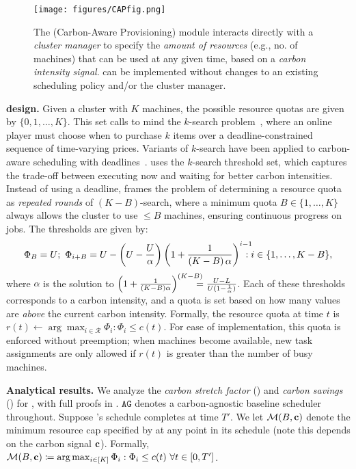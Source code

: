\begin{figure}[t]
    \centering 
    \texttt{[image: figures/CAPfig.png]}\vspace{-1em}
    \caption{The \CAP (Carbon-Aware Provisioning) module interacts directly with a \textit{cluster manager} %
    to specify the \textit{amount of resources} (e.g., no. of machines) that can be used at any given time, based on a \textit{carbon intensity signal}.  \CAP can be implemented without changes to an existing scheduling policy and/or the cluster manager.}
    \label{fig:cap-diagram}\vspace{-0.5cm}
\end{figure}


\noindent\textbf{\CAP design. } Given a cluster with $K$ machines, the possible resource quotas are given by $\{0, 1, \dots, K\}$. 
This set calls to mind the $k$-search problem~\cite{Lorenz:08}, where an online player must choose when to purchase $k$ items over a deadline-constrained sequence of time-varying prices. Variants of $k$-search have been applied to carbon-aware scheduling with deadlines~\cite{Lechowicz:23, Hanafy:23}.
\CAP uses the $k$-search threshold set, which captures the trade-off between executing now and waiting for better carbon intensities. 
Instead of using a deadline, \CAP frames the problem of determining a resource quota as \textit{repeated rounds} of $(K-B)$-search, where a minimum quota $B \in \{1, \dots, K\}$ always allows the cluster to use $\le B$ machines, ensuring continuous progress on jobs.  The thresholds are given by:
{\small
\begin{equation*}
\Phi_B = U; \ 
\Phi_{i+B} = U - \left(U - \frac{U}{\alpha} \right) \left( 1 + \frac{1}{\left(K-B\right)\alpha} \right)^{i-1} \kern-1em :  i \in \{1, \dots, K-B\},
\end{equation*}}
\noindent where $\alpha$ is the solution to $\left( 1 + \frac{1}{\left(K-B\right)\alpha} \right)^{\left(K-B\right)} \kern-1em = \frac{U-L}{U(1 - \frac{1}{\alpha})}$.  Each of these thresholds corresponds to a carbon intensity, and a quota is set based on how many values are \textit{above} the current carbon intensity.  Formally, the resource quota at time $t$ is $r(t) \gets \arg \max_{i\in \mathcal{R}} \Phi_i : \Phi_i \le c(t)$.  For ease of implementation, this quota is enforced without preemption; when machines become available, new task assignments are only allowed if $r(t)$ is greater than the number of busy machines.

\noindent\textbf{Analytical results. }
We analyze the \textit{carbon stretch factor} () and \textit{carbon savings} () for \CAP, with full proofs in .  $\texttt{AG}$ denotes a carbon-agnostic baseline scheduler throughout. Suppose \CAP's schedule completes at time $T'$.
We let $\mathcal{M}(B, {\mathbf{c}})$ denote the minimum resource cap specified by \CAP at any point in its schedule (note this depends on the carbon signal ${\mathbf{c}}$).  Formally, $\mathcal{M}(B, {\mathbf{c}}) \coloneqq \arg \max_{i\in[K]} \Phi_i : \Phi_i \le c(t) \ \forall t \in [0, T']$.

